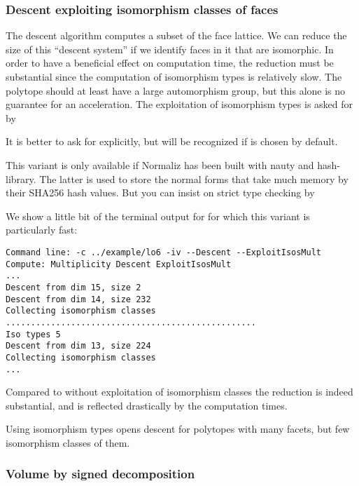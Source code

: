 \subsubsection{Descent exploiting isomorphism classes of faces}\label{ExploitIsosoMult}

The descent algorithm computes a subset of the face lattice. We can reduce the size of this ``descent system'' if we identify faces in it that are isomorphic. In order to have a beneficial effect on computation time, the reduction must be substantial since the computation of isomorphism types is relatively slow. The polytope should at least have a large automorphism group, but this alone is no guarantee for an acceleration. The exploitation of isomorphism types is asked for by
\begin{itemize}
\end{itemize}
It is better to ask for  explicitly, but  will be recognized if  is chosen by default.

This variant is only available if Normaliz has been built with nauty and hash-library. The latter is used to store the normal forms that take much memory by their SHA256 hash values. But you can insist on strict type checking by
\begin{itemize}
	\itemtt[StrictIsoTypes]
\end{itemize}

We show a little bit of the terminal output for  for which this variant is particularly fast:
\begin{Verbatim}
Command line: -c ../example/lo6 -iv --Descent --ExploitIsosMult 
Compute: Multiplicity Descent ExploitIsosMult 
...
Descent from dim 15, size 2
Descent from dim 14, size 232
Collecting isomorphism classes
..................................................
Iso types 5
Descent from dim 13, size 224
Collecting isomorphism classes
...
\end{Verbatim}
Compared to  without exploitation of isomorphism classes the reduction is indeed substantial, and is reflected drastically by the computation times.

Using isomorphism types opens descent for polytopes with many facets, but few isomorphism classes of them.

\subsubsection{Volume by signed decomposition}

